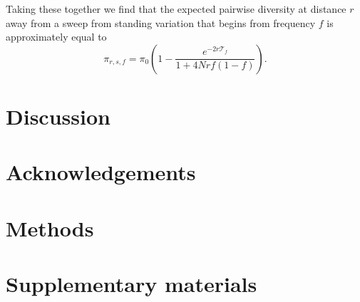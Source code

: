 \documentclass[a4paper,10pt]{article}
\begin{document}
Taking these together we find that the expected pairwise diversity at distance $r$ away from a sweep from standing variation that begins from frequency $f$ is approximately equal to
$$\pi_{r,s,f} = \pi_0\left(1 - \frac{e^{-2r\mathcal{T}_f}}{1 + 4Nrf\left(1-f\right)}\right).$$

\section{Discussion}


\section{Acknowledgements}

\section{Methods}





\section{Supplementary materials}

\setcounter{table}{0}
\renewcommand{\thetable}{S\arabic{table}}
\setcounter{figure}{0}
\renewcommand{\thefigure}{S\arabic{figure}}
\end{document}
